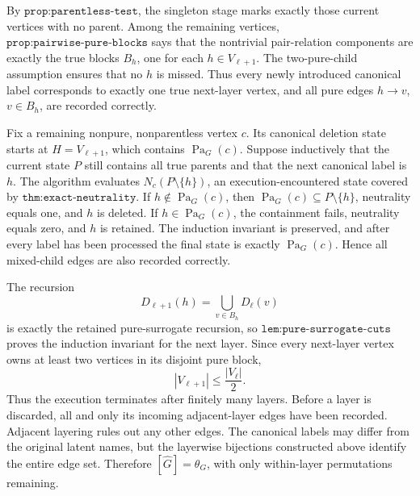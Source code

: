 By \(\texttt{prop:parentless-test}\), the singleton stage marks exactly those current vertices with no parent.  Among the remaining vertices, \(\texttt{prop:pairwise-pure-blocks}\) says that the nontrivial pair-relation components are exactly the true blocks \(B_h\), one for each \(h\in V_{\ell+1}\).  The two-pure-child assumption ensures that no \(h\) is missed.  Thus every newly introduced canonical label corresponds to exactly one true next-layer vertex, and all pure edges \(h\to v\), \(v\in B_h\), are recorded correctly.

Fix a remaining nonpure, nonparentless vertex \(c\).  Its canonical deletion state starts at \(H=V_{\ell+1}\), which contains \(\operatorname{Pa}_G(c)\).  Suppose inductively that the current state \(P\) still contains all true parents and that the next canonical label is \(h\).  The algorithm evaluates \(N_c(P\setminus\{h\})\), an execution-encountered state covered by \(\texttt{thm:exact-neutrality}\).  If \(h\notin\operatorname{Pa}_G(c)\), then \(\operatorname{Pa}_G(c)\subseteq P\setminus\{h\}\), neutrality equals one, and \(h\) is deleted.  If \(h\in\operatorname{Pa}_G(c)\), the containment fails, neutrality equals zero, and \(h\) is retained.  The induction invariant is preserved, and after every label has been processed the final state is exactly \(\operatorname{Pa}_G(c)\).  Hence all mixed-child edges are also recorded correctly.

The recursion
\[
 D_{\ell+1}(h)=\bigcup_{v\in B_h}D_\ell(v)
\]
is exactly the retained pure-surrogate recursion, so \(\texttt{lem:pure-surrogate-cuts}\) proves the induction invariant for the next layer.  Since every next-layer vertex owns at least two vertices in its disjoint pure block,
\[
 |V_{\ell+1}|\leq \frac{|V_\ell|}{2}. \tag{1}
\]
Thus the execution terminates after finitely many layers.  Before a layer is discarded, all and only its incoming adjacent-layer edges have been recorded.  Adjacent layering rules out any other edges.  The canonical labels may differ from the original latent names, but the layerwise bijections constructed above identify the entire edge set.  Therefore \([\widehat G]=\theta_G\), with only within-layer permutations remaining.

